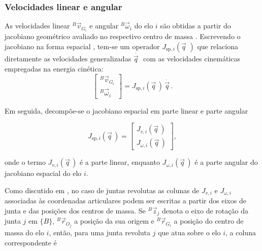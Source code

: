 \subsubsection{Velocidades linear e angular}
\label{sec:dinAcoplada_veloc_linear_angular}

As velocidades linear ${}^{B}\!\vec v_{G_i}$ e angular ${}^{B}\!\vec\omega_i$
do elo $i$ são obtidas a partir do jacobiano geométrico avaliado no respectivo
centro de massa \cite{craig2005,Wang2003KinematicsDynamics}.
Escrevendo o jacobiano na forma espacial \cite{murray1994mathematical},
tem-se um operador $J_{\text{sp},i}(\vec q\, \, )$ que
relaciona diretamente as velocidades generalizadas
$\dot{\vec q\, \, }$ com as velocidades cinemáticas empregadas na energia
cinética:
\begin{equation}
\begin{bmatrix}
{}^{B}\!\vec v_{G_i} \\
{}^{B}\!\vec\omega_i
\end{bmatrix}
=
J_{\text{sp},i}(\vec q\,)\,\dot{\vec q\,}.
\label{eq:jacobianos_vGi1}
\end{equation}

Em seguida, decompõe-se o jacobiano espacial em parte linear e parte angular

\begin{equation}
J_{\text{sp},i}(\vec q\,)
=
\begin{bmatrix}
J_{v,i}(\vec q\,) \\
J_{\omega,i}(\vec q\,)
\end{bmatrix},
\label{eq:jacobianos_vGi2}
\end{equation}

onde o termo $J_{v,i}(\vec q\, )$ é a parte linear, enquanto
$J_{\omega,i}(\vec q\, )$ é a parte angular do jacobiano espacial do elo $i$.

Como discutido em \cite{sciavicco_siciliano2010}, no caso de juntas
revolutas as colunas de $J_{v,i}$ e $J_{\omega,i}$ associadas às coordenadas
articulares podem ser escritas a partir dos eixos de junta e das posições
dos centros de massa.
Se ${}^{B}\!\vec z_j$ denota o eixo de rotação da junta $j$ em $\{B\}$,
${}^{B}\!\vec r_{O_j}$ a posição da sua origem e ${}^{B}\!\vec r_{G_i}$ a
posição do centro de massa do elo $i$, então, para uma junta revoluta $j$
que atua sobre o elo $i$, a coluna correspondente é


